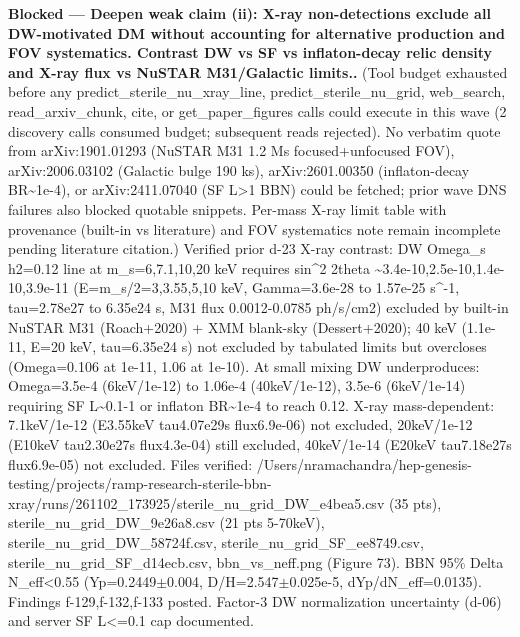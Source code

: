 \documentclass[11pt,a4paper]{article}
\begin{document}
\textbf{Blocked --- Deepen weak claim (ii): X-ray non-detections exclude all DW-motivated DM without accounting for alternative production and FOV systematics. Contrast DW vs SF vs inflaton-decay relic density and X-ray flux vs NuSTAR M31/Galactic limits..} (Tool budget exhausted before any predict\_sterile\_nu\_xray\_line, predict\_sterile\_nu\_grid, web\_search, read\_arxiv\_chunk, cite, or get\_paper\_figures calls could execute in this wave (2 discovery calls consumed budget; subsequent reads rejected). No verbatim quote from arXiv:1901.01293 (NuSTAR M31 1.2 Ms focused+unfocused FOV), arXiv:2006.03102 (Galactic bulge 190 ks), arXiv:2601.00350 (inflaton-decay BR\textasciitilde{}1e-4), or arXiv:2411.07040 (SF L\textgreater{}1 BBN) could be fetched; prior wave DNS failures also blocked quotable snippets. Per-mass X-ray limit table with provenance (built-in vs literature) and FOV systematics note remain incomplete pending literature citation.) Verified prior d-23 X-ray contrast: DW Omega\_s h2=0.12 line at m\_s=6,7.1,10,20 keV requires sin\textasciicircum{}2 2theta \textasciitilde{}3.4e-10,2.5e-10,1.4e-10,3.9e-11 (E=m\_s/2=3,3.55,5,10 keV, Gamma=3.6e-28 to 1.57e-25 s\textasciicircum{}-1, tau=2.78e27 to 6.35e24 s, M31 flux 0.0012-0.0785 ph/s/cm2) excluded by built-in NuSTAR M31 (Roach+2020) + XMM blank-sky (Dessert+2020); 40 keV (1.1e-11, E=20 keV, tau=6.35e24 s) not excluded by tabulated limits but overcloses (Omega=0.106 at 1e-11, 1.06 at 1e-10). At small mixing DW underproduces: Omega=3.5e-4 (6keV/1e-12) to 1.06e-4 (40keV/1e-12), 3.5e-6 (6keV/1e-14) requiring SF L\textasciitilde{}0.1-1 or inflaton BR\textasciitilde{}1e-4 to reach 0.12. X-ray mass-dependent: 7.1keV/1e-12 (E3.55keV tau4.07e29s flux6.9e-06) not excluded, 20keV/1e-12 (E10keV tau2.30e27s flux4.3e-04) still excluded, 40keV/1e-14 (E20keV tau7.18e27s flux6.9e-05) not excluded. Files verified: /Users/nramachandra/hep-genesis-testing/projects/ramp-research-sterile-bbn-xray/runs/261102\_173925/sterile\_nu\_grid\_DW\_e4bea5.csv (35 pts), sterile\_nu\_grid\_DW\_9e26a8.csv (21 pts 5-70keV), sterile\_nu\_grid\_DW\_58724f.csv, sterile\_nu\_grid\_SF\_ee8749.csv, sterile\_nu\_grid\_SF\_d14ecb.csv, bbn\_vs\_neff.png (Figure 73). BBN 95\% Delta N\_eff\textless{}0.55 (Yp=0.2449$\pm$0.004, D/H=2.547$\pm$0.025e-5, dYp/dN\_eff=0.0135). Findings f-129,f-132,f-133 posted. Factor-3 DW normalization uncertainty (d-06) and server SF L\textless{}=0.1 cap documented.
\end{document}
